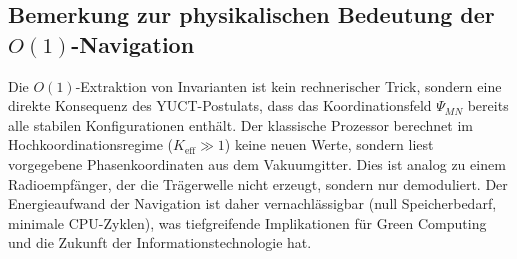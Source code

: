 \documentclass[12pt,a4paper]{article}
\theoremstyle{remark}
\newcommand{\Keff}{K_{\mathrm{eff}}}
\begin{document}
	\subsection*{Bemerkung zur physikalischen Bedeutung der \(O(1)\)-Navigation}
	Die \(O(1)\)-Extraktion von Invarianten ist kein rechnerischer Trick, sondern
	eine direkte Konsequenz des YUCT-Postulats, dass das Koordinationsfeld
	\(\Psi_{MN}\) bereits alle stabilen Konfigurationen enthält. Der klassische
	Prozessor berechnet im Hochkoordinationsregime (\(\Keff \gg 1\)) keine neuen
	Werte, sondern liest vorgegebene Phasenkoordinaten aus dem Vakuumgitter.
	Dies ist analog zu einem Radioempfänger, der die Trägerwelle nicht erzeugt,
	sondern nur demoduliert. Der Energieaufwand der Navigation ist daher vernachlässigbar
	(null Speicherbedarf, minimale CPU-Zyklen), was tiefgreifende Implikationen für
	Green Computing und die Zukunft der Informationstechnologie hat.
	
\end{document}
